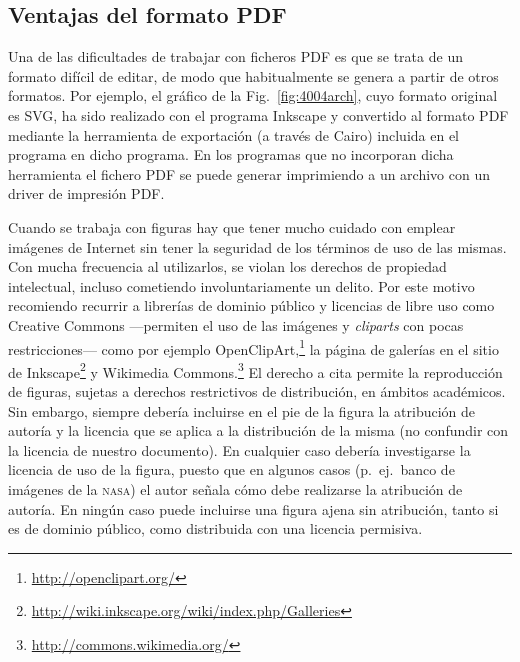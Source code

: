 \documentclass[11pt,a4paper]{article}
\begin{document}
\subsection{Ventajas del formato \textsf{PDF}}
Una de las dificultades de trabajar con ficheros \textsf{PDF} es que se trata de un formato difícil de editar, de modo que habitualmente se genera a partir de otros formatos. Por ejemplo, el gráfico de la Fig.~\ref{fig:4004arch}, cuyo formato original es \textsf{SVG}, ha sido realizado con el programa \textsf{Inkscape} y convertido al formato \textsf{PDF} mediante la herramienta de exportación (a través de \textsf{Cairo}) incluida en el programa en dicho programa. En los programas que no incorporan dicha herramienta el fichero \textsf{PDF} se puede generar imprimiendo a un archivo con un driver de impresión \textsf{PDF}. 

Cuando se trabaja con figuras hay que tener mucho cuidado con emplear imágenes de Internet sin tener la seguridad de los términos de uso de las mismas. Con mucha frecuencia al utilizarlos, se violan los derechos de propiedad intelectual, incluso cometiendo involuntariamente un delito. Por este motivo recomiendo recurrir a librerías de dominio público y licencias de libre uso como Creative Commons ---permiten el uso de las imágenes y \emph{cliparts} con pocas restricciones--- como por ejemplo OpenClipArt,\footnote{\url{http://openclipart.org/}} la página de galerías en el sitio de Inkscape\footnote{\url{http://wiki.inkscape.org/wiki/index.php/Galleries}} y Wikimedia Commons.\footnote{\url{http://commons.wikimedia.org/}} El derecho a cita permite la reproducción de figuras, sujetas a derechos restrictivos de distribución, en ámbitos académicos. Sin embargo, siempre debería incluirse en el pie de la figura la atribución de autoría y la licencia que se aplica a la distribución de la misma (no confundir con la licencia de nuestro documento). En cualquier caso debería investigarse la licencia de uso de la figura, puesto que en algunos casos (p.~ej.\ banco de imágenes de la \textsc{nasa}) el autor señala cómo debe realizarse la atribución de autoría. En ningún caso puede incluirse una figura ajena sin atribución, tanto si es de dominio público, como distribuida con una licencia permisiva.
\end{document}
